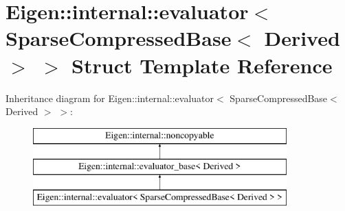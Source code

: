 \hypertarget{struct_eigen_1_1internal_1_1evaluator_3_01_sparse_compressed_base_3_01_derived_01_4_01_4}{}\section{Eigen\+::internal\+::evaluator$<$ Sparse\+Compressed\+Base$<$ Derived $>$ $>$ Struct Template Reference}
\label{struct_eigen_1_1internal_1_1evaluator_3_01_sparse_compressed_base_3_01_derived_01_4_01_4}
Inheritance diagram for Eigen\+::internal\+::evaluator$<$ Sparse\+Compressed\+Base$<$ Derived $>$ $>$\+:\begin{figure}[H]
\begin{center}
\leavevmode
\includegraphics[height=3.000000cm]{struct_eigen_1_1internal_1_1evaluator_3_01_sparse_compressed_base_3_01_derived_01_4_01_4}
\end{center}
\end{figure}
